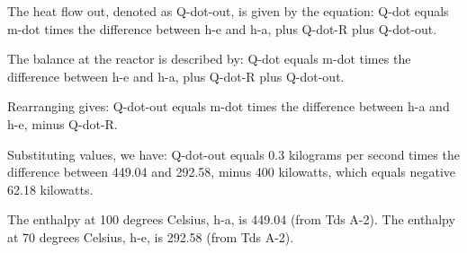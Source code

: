 The heat flow out, denoted as Q-dot-out, is given by the equation:
Q-dot equals m-dot times the difference between h-e and h-a, plus Q-dot-R plus Q-dot-out.

The balance at the reactor is described by:
Q-dot equals m-dot times the difference between h-e and h-a, plus Q-dot-R plus Q-dot-out.

Rearranging gives:
Q-dot-out equals m-dot times the difference between h-a and h-e, minus Q-dot-R.

Substituting values, we have:
Q-dot-out equals 0.3 kilograms per second times the difference between 449.04 and 292.58, minus 400 kilowatts, which equals negative 62.18 kilowatts.

The enthalpy at 100 degrees Celsius, h-a, is 449.04 (from Tds A-2).
The enthalpy at 70 degrees Celsius, h-e, is 292.58 (from Tds A-2).